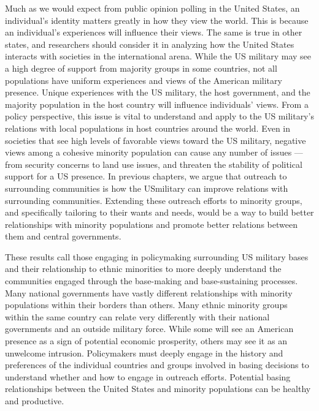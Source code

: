 Much as we would expect from public opinion polling in the United States, an individual's identity matters greatly in how they view the world. This is because an individual's experiences will influence their views. The same is true in other states, and researchers should consider it in analyzing how the United States interacts with societies in the international arena. While the US military may see a high degree of support from majority groups in some countries, not all populations have uniform experiences and views of the American military presence. Unique experiences with the US military, the host government, and the majority population in the host country will influence individuals' views. From a policy perspective, this issue is vital to understand and apply to the US military's relations with local populations in host countries around the world. Even in societies that see high levels of favorable views toward the US military, negative views among a cohesive minority population can cause any number of issues --- from security concerns to land use issues, and threaten the stability of political support for a US presence. In previous chapters, we argue that outreach to surrounding communities is how the USmilitary can improve relations with surrounding communities. Extending these outreach efforts to minority groups, and specifically tailoring to their wants and needs, would be a way to build better relationships with minority populations and promote better relations between them and central governments.  

These results call those engaging in policymaking surrounding US military bases and their relationship to ethnic minorities to more deeply understand the communities engaged through the base-making and base-sustaining processes. Many national governments have vastly different relationships with minority populations within their borders than others. Many ethnic minority groups within the same country can relate very differently with their national governments and an outside military force. While some will see an American presence as a sign of potential economic prosperity, others may see it as an unwelcome intrusion. Policymakers must deeply engage in the history and preferences of the individual countries and groups involved in basing decisions to understand whether and how to engage in outreach efforts. Potential basing relationships between the United States and minority populations can be healthy and productive.





\begin{comment}





\end{comment}








